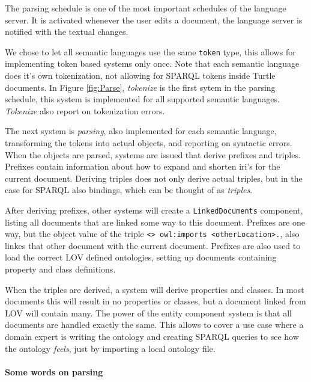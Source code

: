 The parsing schedule is one of the most important schedules of the language server.
It is activated whenever the user edits a document, the language server is notified with the textual changes.

We chose to let all semantic languages use the same \texttt{token} type, this allows for implementing token based systems only once.
Note that each semantic language does it's own tokenization, not allowing for SPARQL tokens inside Turtle documents.
In Figure \ref{fig:Parse}, \textit{tokenize} is the first sytem in the parsing schedule, this system is implemented for all supported semantic languages. \textit{Tokenize} also report on tokenization errors.

The next system is \textit{parsing}, also implemented for each semantic language, transforming the tokens into actual objects, and reporting on syntactic errors. 
When the objects are parsed, systems are issued that derive prefixes and triples. 
Prefixes contain information about how to expand and shorten iri's for the current document.
Deriving triples does not only derive actual triples, but in the case for SPARQL also bindings, which can be thought of as \textit{triples}.

After deriving prefixes, other systems will create a \texttt{LinkedDocuments} component, listing all documents that are linked some way to this document.
Prefixes are one way, but the object value of the triple \texttt{<> owl:imports <otherLocation>.}, also linkes that other document with the current document.
Prefixes are also used to load the correct LOV defined ontologies, setting up documents containing property and class definitions.

When the triples are derived, a system will derive properties and classes.
In most documents this will result in no properties or classes, but a document linked from LOV will contain many.
The power of the entity component system is that all documents are handled exactly the same.
This allows to cover a use case where a domain expert is writing the ontology and creating SPARQL queries to see how the ontology \textit{feels}, just by importing a local ontology file.

\paragraph{Some words on parsing}

